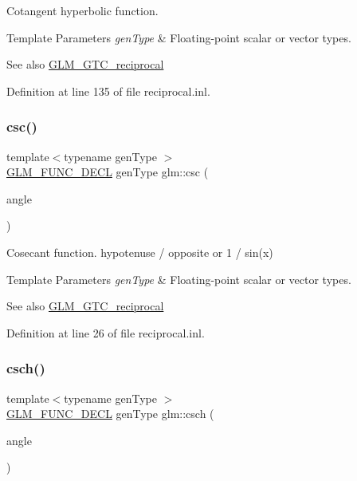 Cotangent hyperbolic function.


\begin{DoxyTemplParams}{Template Parameters}
{\em gen\+Type} & Floating-\/point scalar or vector types.\\
\hline
\end{DoxyTemplParams}
\begin{DoxySeeAlso}{See also}
\mbox{\hyperlink{group__gtc__reciprocal}{G\+L\+M\+\_\+\+G\+T\+C\+\_\+reciprocal}} 
\end{DoxySeeAlso}


Definition at line 135 of file reciprocal.\+inl.

\mbox{\label{group__gtc__reciprocal_ga59dd0005b6474eea48af743b4f14ebbb}} 
\subsubsection{\texorpdfstring{csc()}{csc()}}
{\footnotesize\ttfamily template$<$typename gen\+Type $>$ \\
\mbox{\hyperlink{setup_8hpp_ab2d052de21a70539923e9bcbf6e83a51}{G\+L\+M\+\_\+\+F\+U\+N\+C\+\_\+\+D\+E\+CL}} gen\+Type glm\+::csc (\begin{DoxyParamCaption}\item[{gen\+Type}]{angle }\end{DoxyParamCaption})}

Cosecant function. hypotenuse / opposite or 1 / sin(x)


\begin{DoxyTemplParams}{Template Parameters}
{\em gen\+Type} & Floating-\/point scalar or vector types.\\
\hline
\end{DoxyTemplParams}
\begin{DoxySeeAlso}{See also}
\mbox{\hyperlink{group__gtc__reciprocal}{G\+L\+M\+\_\+\+G\+T\+C\+\_\+reciprocal}} 
\end{DoxySeeAlso}


Definition at line 26 of file reciprocal.\+inl.

\mbox{\label{group__gtc__reciprocal_ga6d95843ff3ca6472ab399ba171d290a0}} 
\subsubsection{\texorpdfstring{csch()}{csch()}}
{\footnotesize\ttfamily template$<$typename gen\+Type $>$ \\
\mbox{\hyperlink{setup_8hpp_ab2d052de21a70539923e9bcbf6e83a51}{G\+L\+M\+\_\+\+F\+U\+N\+C\+\_\+\+D\+E\+CL}} gen\+Type glm\+::csch (\begin{DoxyParamCaption}\item[{gen\+Type}]{angle }\end{DoxyParamCaption})}

